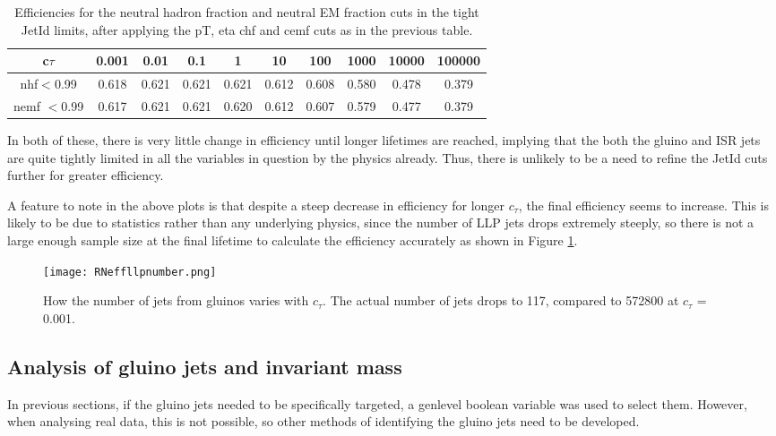 \documentclass{article}
\begin{document}
\begin{table}
\begin{center}
\begin{tabular}{ |c|c|c|c|c|c|c|c|c|c| } 
 \hline
 c$\tau$ &0.001 & 0.01 & 0.1 & 1 & 10 & 100 & 1000 & 10000 & 100000 \\ 
 \hline

 nhf$<$0.99 &0.618& 0.621& 0.621& 0.621& 0.612& 0.608& 0.580& 0.478& 0.379\\
 \hline
 nemf $<$0.99& 0.617& 0.621& 0.621& 0.620& 0.612& 0.607& 0.579& 0.477& 0.379\\
 \hline
\end{tabular}

\caption{Efficiencies for the neutral hadron fraction and neutral EM fraction cuts in the tight JetId limits, after applying the pT, eta chf and cemf cuts as in the previous table.}
\end{center}
\end{table}

In both of these, there is very little change in efficiency until longer lifetimes are reached, implying that the both the gluino and ISR jets are quite tightly limited in all the variables in question by the physics already. Thus, there is unlikely to be a need to refine the JetId cuts further for greater efficiency. 

A feature to note in the above plots is that despite a steep decrease in efficiency for longer $c_{\tau}$, the final efficiency seems to increase. This is likely to be due to statistics rather than any underlying physics, since the number of LLP jets drops extremely steeply, so there is not a large enough sample size at the final lifetime to calculate the efficiency accurately as shown in Figure \ref{id5}.

\begin{figure}[H]
\centering
\texttt{[image: RNeffllpnumber.png]}
\caption{How the number of jets from gluinos varies with $c_{\tau}$. The actual number of jets drops to 117, compared to 572800 at $c_{\tau}$ = 0.001.}
	\label{id5}
\end{figure}

\subsection*{Analysis of gluino jets and invariant mass}
In previous sections, if the gluino jets needed to be specifically targeted, a genlevel boolean variable was used to select them. However, when analysing real data, this is not possible, so other methods of identifying the gluino jets need to be developed. 
\end{document}
